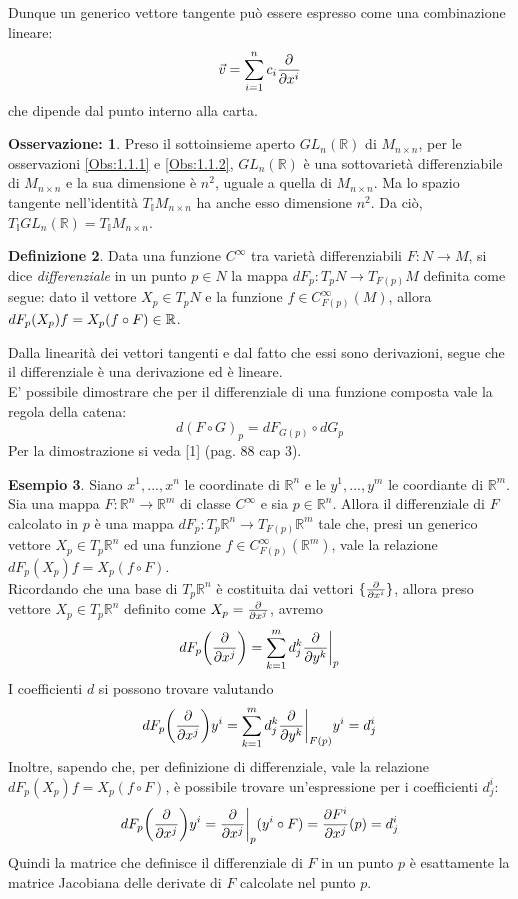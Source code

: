 \documentclass[12pt,a4paper]{report}
\theoremstyle{definition}
\newtheorem{Def}{Definizione}[chapter]
\theoremstyle{Theorem}
\theoremstyle{definition}
\newtheorem{Ex}[Def]{Esempio}
\theoremstyle{definition}
\theoremstyle{definition}
\newtheorem{Obs}[Def]{Osservazione:}
\begin{document}
Dunque un generico vettore tangente può essere espresso come una combinazione lineare: $$\vec{v}=\sum_{i=1}^{n}c_i{\partial\over \partial x^i}$$ che dipende dal punto interno alla carta. 
\begin{Obs} \label{Obs 1.1.3}
	Preso il sottoinsieme aperto $GL_n(\mathbb{R})$ di $M_{n\times n}$, per le osservazioni \ref{Obs:1.1.1} e \ref{Obs:1.1.2}, $GL_n(\mathbb{R})$ è una sottovarietà differenziabile di $M_{n\times n}$ e la sua dimensione è $n^2$, uguale a quella di $M_{n\times n}$. Ma lo spazio tangente nell'identità $T_\mathbb{I}M_{n\times n}$ ha anche esso dimensione $n^2$. Da ciò, $T_\mathbb{I}GL_n(\mathbb{R})=T_\mathbb{I}M_{n\times n}$.
\end{Obs}
\begin{Def}
	Data una funzione $C^\infty$ tra varietà differenziabili $F:N\rightarrow M$, si dice \textit{differenziale} in un punto $p\in N$ la mappa $dF_p:T_pN\rightarrow T_{F(p)}M$ definita come segue: dato il vettore $X_p\in T_pN$ e la funzione $f\in C_{F(p)}^\infty(M)$, allora $dF_p(X_p)f=\\X_p(f\circ F)\in\mathbb{R}$.
\end{Def}
Dalla linearità dei vettori tangenti e dal fatto che essi sono derivazioni, segue che il differenziale è una derivazione ed è lineare. \\
E' possibile dimostrare che per il differenziale di una funzione composta vale la regola della catena: $$d(F\circ G)_p=dF_{G(p)}\circ dG_p$$ Per la dimostrazione si veda [1] (pag. 88 cap 3).
\begin{Ex}
	Siano $x^1,...,x^n$ le coordinate di $\mathbb{R}^n$ e le $y^1,...,y^m$ le coordiante di $\mathbb{R}^m$. Sia una mappa $F:\mathbb{R}^n\rightarrow \mathbb{R}^m$ di classe $C^\infty$ e sia $p\in \mathbb{R}^n$. Allora il differenziale di $F$ calcolato in $p$ è una mappa $dF_p:T_p\mathbb{R}^n\rightarrow T_{F(p)}\mathbb{R}^m$ tale che, presi un generico vettore $X_p\in T_p\mathbb{R}^n$ ed una funzione $f\in C_{F(p)}^\infty(\mathbb{R}^m)$, vale la relazione $dF_p(X_p)f=X_p(f\circ F)$.\\
	Ricordando che una base di $T_p\mathbb{R}^n$ è costituita dai vettori $\{{\partial\over\partial x^i}\}$, allora preso vettore $X_p\in T_p\mathbb{R}^n$ definito come $X_p={\partial\over \partial x^j}$, avremo $$dF_p\bigg{(}{\partial\over \partial x^j}\bigg{)}=\sum_{k=1}^{m}d_j^k{\partial\over \partial y^k}\bigg{\rvert}_p$$
	I coefficienti $d$ si possono trovare valutando 
	$$dF_p\bigg{(}{\partial\over \partial x^j}\bigg{)}y^i=\sum_{k=1}^{m}d_j^k{\partial\over \partial y^k}\bigg{\rvert}_{F(p)}y^i=d_j^i$$
	Inoltre, sapendo che, per definizione di differenziale, vale la relazione $dF_p(X_p)f=X_p(f\circ F)$, è possibile trovare un'espressione per i coefficienti $d_j^i$:
	$$dF_p\bigg{(}{\partial\over \partial x^j}\bigg{)}y^i={\partial\over \partial x^j}\bigg{\rvert}_p(y^i\circ F)={\partial F^i\over \partial x^j}(p)=d^i_j$$
	Quindi la matrice che definisce il differenziale di $F$ in un punto $p$ è esattamente la matrice Jacobiana delle derivate di $F$ calcolate nel punto $p$.
\end{Ex}
\end{document}
